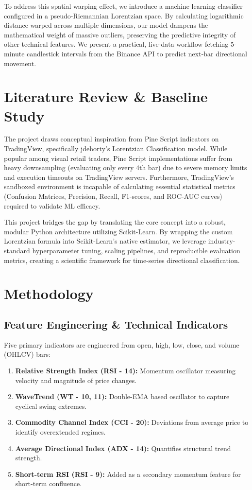\documentclass[conference]{IEEEtran}
\begin{document}
To address this spatial warping effect, we introduce a machine learning classifier configured in a pseudo-Riemannian Lorentzian space. By calculating logarithmic distance warped across multiple dimensions, our model dampens the mathematical weight of massive outliers, preserving the predictive integrity of other technical features. We present a practical, live-data workflow fetching 5-minute candlestick intervals from the Binance API to predict next-bar directional movement.

\section{Literature Review \& Baseline Study}
The project draws conceptual inspiration from Pine Script indicators on TradingView, specifically jdehorty's Lorentzian Classification model. While popular among visual retail traders, Pine Script implementations suffer from heavy downsampling (evaluating only every 4th bar) due to severe memory limits and execution timeouts on TradingView servers. Furthermore, TradingView's sandboxed environment is incapable of calculating essential statistical metrics (Confusion Matrices, Precision, Recall, F1-scores, and ROC-AUC curves) required to validate ML efficacy.

This project bridges the gap by translating the core concept into a robust, modular Python architecture utilizing Scikit-Learn. By wrapping the custom Lorentzian formula into Scikit-Learn's native estimator, we leverage industry-standard hyperparameter tuning, scaling pipelines, and reproducible evaluation metrics, creating a scientific framework for time-series directional classification.

\section{Methodology}

\subsection{Feature Engineering \& Technical Indicators}
Five primary indicators are engineered from open, high, low, close, and volume (OHLCV) bars:
\begin{enumerate}
\item \textbf{Relative Strength Index (RSI - 14):} Momentum oscillator measuring velocity and magnitude of price changes.
\item \textbf{WaveTrend (WT - 10, 11):} Double-EMA based oscillator to capture cyclical swing extremes.
\item \textbf{Commodity Channel Index (CCI - 20):} Deviations from average price to identify overextended regimes.
\item \textbf{Average Directional Index (ADX - 14):} Quantifies structural trend strength.
\item \textbf{Short-term RSI (RSI - 9):} Added as a secondary momentum feature for short-term confluence.
\end{enumerate}
\end{document}

